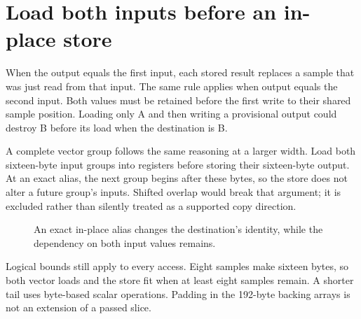 \section{Load both inputs before an in-place store}\label{pcm-aliases}
When the output equals the first input, each stored result replaces a sample that
was just read from that input. The same rule applies when output equals the second
input. Both values must be retained before the first write to their shared sample
position. Loading only A and then writing a provisional output could destroy B
before its load when the destination is B.

A complete vector group follows the same reasoning at a larger width. Load both
sixteen-byte input groups into registers before storing their sixteen-byte output.
At an exact alias, the next group begins after these bytes, so the store does not
alter a future group's inputs. Shifted overlap would break that argument; it is
excluded rather than silently treated as a supported copy direction.

\begin{figure}[htbp]
  \centering
  \caption{An exact in-place alias changes the destination's identity, while the dependency on both input values remains.}
\end{figure}

Logical bounds still apply to every access. Eight samples make sixteen bytes, so
both vector loads and the store fit when at least eight samples remain. A shorter
tail uses byte-based scalar operations. Padding in the 192-byte backing arrays is
not an extension of a passed slice.
